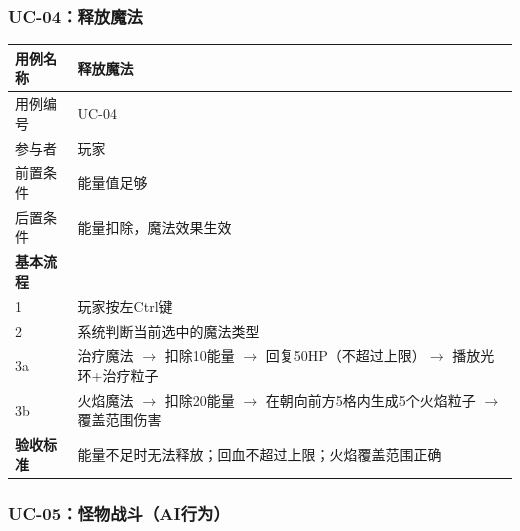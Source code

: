 \documentclass[12pt,a4paper]{article}
\begin{document}
\subsubsection{UC-04：释放魔法}

\begin{table}[htbp]
\centering
\begin{tabularx}{\textwidth}{lX}
\toprule
\textbf{用例名称} & 释放魔法 \\
\midrule
用例编号 & UC-04 \\
参与者 & 玩家 \\
前置条件 & 能量值足够 \\
后置条件 & 能量扣除，魔法效果生效 \\
\midrule
\textbf{基本流程} & \\
1 & 玩家按左Ctrl键 \\
2 & 系统判断当前选中的魔法类型 \\
3a & 治疗魔法 $\rightarrow$ 扣除10能量 $\rightarrow$ 回复50HP（不超过上限）$\rightarrow$ 播放光环+治疗粒子 \\
3b & 火焰魔法 $\rightarrow$ 扣除20能量 $\rightarrow$ 在朝向前方5格内生成5个火焰粒子 $\rightarrow$ 覆盖范围伤害 \\
\midrule
\textbf{验收标准} & 能量不足时无法释放；回血不超过上限；火焰覆盖范围正确 \\
\bottomrule
\end{tabularx}
\end{table}

\subsubsection{UC-05：怪物战斗（AI行为）}
\end{document}
